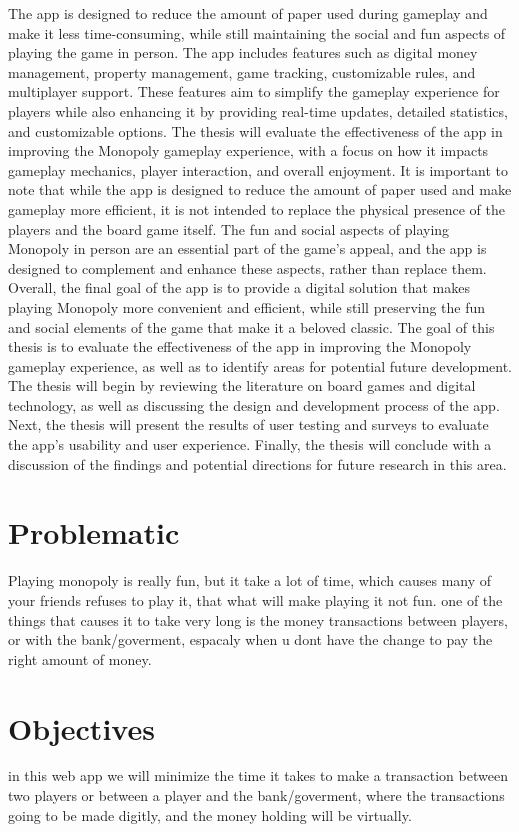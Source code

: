\documentclass{article}
\begin{document}
         The app is designed to reduce the amount of paper used during gameplay and make it less time-consuming, while still maintaining the social and fun aspects of playing the game in person.
        The app includes features such as digital money management, property management, game tracking, customizable rules, and multiplayer support. 
        These features aim to simplify the gameplay experience for players while also enhancing it by providing real-time updates, detailed statistics, and customizable options. The thesis will evaluate the effectiveness of the app in improving the Monopoly gameplay experience, with a focus on how it impacts gameplay mechanics, player interaction, and overall enjoyment.
        It is important to note that while the app is designed to reduce the amount of paper used and make gameplay more efficient, it is not intended to replace the physical presence of the players and the board game itself. The fun and social aspects of playing Monopoly in person are an essential part of the game's appeal, and the app is designed to complement and enhance these aspects, rather than replace them.
        Overall, the final goal of the app is to provide a digital solution that makes playing Monopoly more convenient and efficient, while still preserving the fun and social elements of the game that make it a beloved classic.
        The goal of this thesis is to evaluate the effectiveness of the app in improving the Monopoly gameplay experience, as well as to identify areas for potential future development. 
        The thesis will begin by reviewing the literature on board games and digital technology, as well as discussing the design and development process of the app. Next, the thesis will present the results of user testing and surveys to evaluate the app's usability and user experience. Finally, the thesis will conclude with a discussion of the findings and potential directions for future research in this area.


\section{Problematic}\label{sec:prbm}
Playing monopoly is really fun, but it take a lot of time, which causes many of your friends refuses to play it, that what will make playing it not fun.
one of the things that causes it to take very long is the money transactions between players, or with the bank/goverment, espacaly when u dont have the change to pay the right amount of money.

\section{Objectives}\label{sec:obj}
in this web app we will minimize the time it takes to make a transaction between two players or between a player and the bank/goverment, where the transactions going to be made digitly, and the money holding will be virtually.
\end{document}
